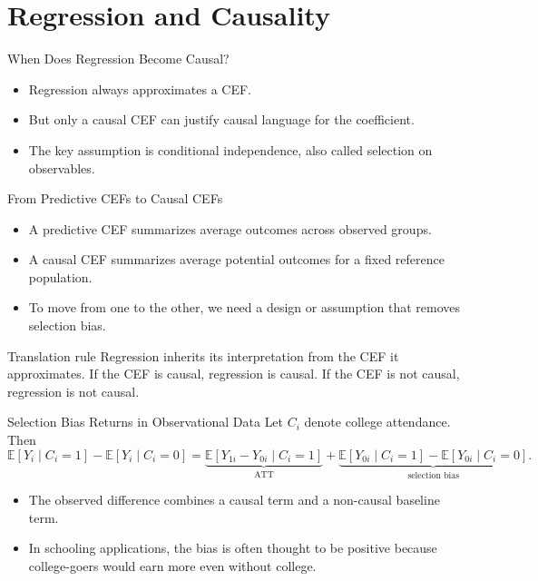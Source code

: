 \documentclass[11pt,aspectratio=169]{beamer}
\newcommand{\E}{\mathbb{E}}
\newcommand{\ATT}{\mathrm{ATT}}
\newcommand{\derivbutton}[1]{\vspace{0.4em}\hfill\hyperlink{app:#1}{\beamerbutton{Appendix details}}}
\begin{document}
\section{Regression and Causality}

\begin{frame}{When Does Regression Become Causal?}
  \begin{itemize}
    \item Regression always approximates a CEF.
    \item But only a causal CEF can justify causal language for the coefficient.
    \item The key assumption is conditional independence, also called selection on observables.
  \end{itemize}
\end{frame}

\begin{frame}{From Predictive CEFs to Causal CEFs}
  \begin{itemize}
    \item A predictive CEF summarizes average outcomes across observed groups.
    \item A causal CEF summarizes average potential outcomes for a fixed reference population.
    \item To move from one to the other, we need a design or assumption that removes selection bias.
  \end{itemize}
  \begin{block}{Translation rule}
    Regression inherits its interpretation from the CEF it approximates. If the CEF is causal, regression is causal. If the CEF is not causal, regression is not causal.
  \end{block}
\end{frame}

\begin{frame}{Selection Bias Returns in Observational Data}
  \hypertarget{main:cia}{}
  Let \(C_i\) denote college attendance. Then
  \[
  \E[Y_i \mid C_i=1]-\E[Y_i \mid C_i=0]
  =
  \underbrace{\E[Y_{1i}-Y_{0i} \mid C_i=1]}_{\ATT}
  +
  \underbrace{\E[Y_{0i} \mid C_i=1]-\E[Y_{0i} \mid C_i=0]}_{\text{selection bias}}.
  \]
  \begin{itemize}
    \item The observed difference combines a causal term and a non-causal baseline term.
    \item In schooling applications, the bias is often thought to be positive because college-goers would earn more even without college.
  \end{itemize}
  \derivbutton{cia-proof}
\end{frame}
\end{document}

